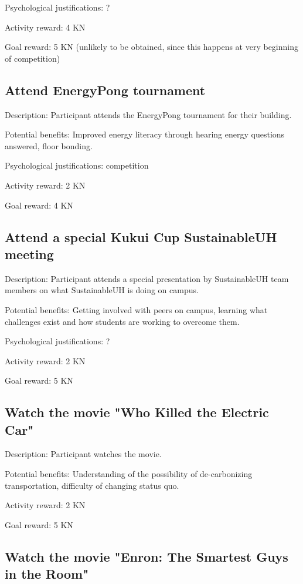 Psychological justifications: ?

Activity reward: 4 KN

Goal reward: 5 KN (unlikely to be obtained, since this happens at very beginning of competition)

\subsection{Attend EnergyPong tournament}

Description: Participant attends the EnergyPong tournament for their building.

Potential benefits: Improved energy literacy through hearing energy questions answered, floor bonding.

Psychological justifications: competition

Activity reward: 2 KN

Goal reward: 4 KN

\subsection{Attend a special Kukui Cup SustainableUH meeting}

Description: Participant attends a special presentation by SustainableUH team members on what SustainableUH is doing on campus.

Potential benefits: Getting involved with peers on campus, learning what challenges exist and how students are working to overcome them.

Psychological justifications: ?

Activity reward: 2 KN

Goal reward: 5 KN

\subsection{Watch the movie "Who Killed the Electric Car"}

Description: Participant watches the movie.

Potential benefits: Understanding of the possibility of de-carbonizing transportation, difficulty of changing status quo.

Activity reward: 2 KN

Goal reward: 5 KN

\subsection{Watch the movie "Enron: The Smartest Guys in the Room"}


